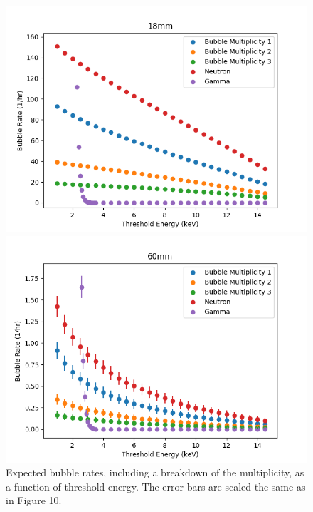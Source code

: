 \documentclass[%
12pt,
twoside,
reprint,
amsmath,amssymb,
aps,
]{article}
\begin{document}
	\begin{figure}[t]
		\begin{minipage}{0.5\textwidth}
			\centering
			\includegraphics[width=1.1\linewidth]{Images/18mm_thresh.png}
		\end{minipage}
		\begin{minipage}{0.5\textwidth}
			\centering
			\includegraphics[width=1.1\linewidth]{Images/60mm_thresh.png}
		\end{minipage}
		\caption{\label{tab:table-name} Expected bubble rates, including a breakdown of the multiplicity, as a function of threshold energy. The error bars are scaled the same as in Figure 10.}
	\end{figure}
	
\end{document}
